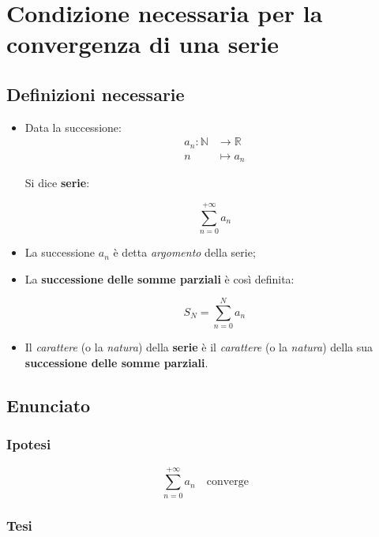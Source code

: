 \documentclass[../dimostrazioni]{subfiles}
\begin{document}
    \chapter{Condizione necessaria per la convergenza di una serie}
    \label{CNconvergenza}

        \section*{Definizioni necessarie}

            \begin{itemize}
                \item Data la successione:
                        \begin{align*}
                            a_n : \mathbb{N} &\longrightarrow \mathbb{R}\\
                            n &\longmapsto a_n 
                        \end{align*}
    
                        Si dice \textbf{serie}:

                        \[  \sum_{n=0}^{+\infty} a_n\]

                \item La successione \(a_n\) è detta \emph{argomento} della serie;
                \item La \textbf{successione delle somme parziali} è così definita:
                      
                        \[  S_N = \sum_{n=0}^{N} a_n\]
                    
                \item Il \emph{carattere} (o la \emph{natura}) della \textbf{serie} è il \emph{carattere} (o la \emph{natura}) della sua \textbf{successione delle somme parziali}.
            \end{itemize}
           

        \section*{Enunciato}

            \subsection*{Ipotesi}

                \[  \sum_{n=0}^{+\infty} a_n \quad \text{converge} \]
                
            \subsection*{Tesi}
\end{document}
